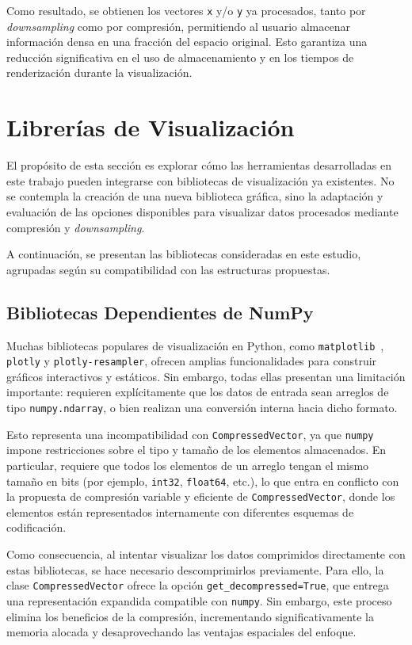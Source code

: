 Como resultado, se obtienen los vectores \texttt{x} y/o \texttt{y} ya procesados, tanto por \textit{downsampling} como por compresión, permitiendo al usuario almacenar información densa en una fracción del espacio original. Esto garantiza una reducción significativa en el uso de almacenamiento y en los tiempos de renderización durante la visualización.


\section{Librerías de Visualización}

El propósito de esta sección es explorar cómo las herramientas desarrolladas en este trabajo pueden integrarse con bibliotecas de visualización ya existentes. No se contempla la creación de una nueva biblioteca gráfica, sino la adaptación y evaluación de las opciones disponibles para visualizar datos procesados mediante compresión y \textit{downsampling}.

A continuación, se presentan las bibliotecas consideradas en este estudio, agrupadas según su compatibilidad con las estructuras propuestas.

\subsection{Bibliotecas Dependientes de NumPy}

Muchas bibliotecas populares de visualización en Python, como \texttt{matplotlib}~\cite{matplotlib}, \texttt{plotly} y \texttt{plotly-resampler}, ofrecen amplias funcionalidades para construir gráficos interactivos y estáticos. Sin embargo, todas ellas presentan una limitación importante: requieren explícitamente que los datos de entrada sean arreglos de tipo \texttt{numpy.ndarray}, o bien realizan una conversión interna hacia dicho formato.

Esto representa una incompatibilidad con \texttt{CompressedVector}, ya que \texttt{numpy} impone restricciones sobre el tipo y tamaño de los elementos almacenados. En particular, requiere que todos los elementos de un arreglo tengan el mismo tamaño en bits (por ejemplo, \texttt{int32}, \texttt{float64}, etc.), lo que entra en conflicto con la propuesta de compresión variable y eficiente de \texttt{CompressedVector}, donde los elementos están representados internamente con diferentes esquemas de codificación.

Como consecuencia, al intentar visualizar los datos comprimidos directamente con estas bibliotecas, se hace necesario descomprimirlos previamente. Para ello, la clase \texttt{CompressedVector} ofrece la opción \texttt{get\_decompressed=True}, que entrega una representación expandida compatible con \texttt{numpy}. Sin embargo, este proceso elimina los beneficios de la compresión, incrementando significativamente la memoria alocada y desaprovechando las ventajas espaciales del enfoque.

